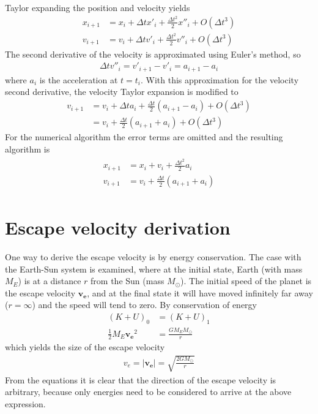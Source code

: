 \documentclass[aps,reprint]{revtex4-1}
\newcommand\blankpage{%
  \null
  \thispagestyle{empty}%
  \addtocounter{page}{-1}%
  \newpage}
\begin{document}
Taylor expanding the position and velocity yields
\begin{align*}
  x_{i+1} &= x_i + \Delta{t} x'_i + \frac{\Delta{t}^2}{2} x''_i + O(\Delta{t}^3) \\
  v_{i+1} &= v_i + \Delta{t} v'_i + \frac{\Delta{t}^2}{2} v''_i + O(\Delta{t}^3)
\end{align*}
The second derivative of the velocity is approximated using Euler's method, so
\begin{align*}
  \Delta{t} v''_i = v'_{i+1} - v'_{i} = a_{i+1} - a_{i}
\end{align*}
where $a_i$ is the acceleration at $t = t_i$. With this approximation for the
velocity second derivative, the velocity Taylor expansion is modified to
\begin{align*}
  v_{i+1} &= v_i + \Delta{t} a_i + \frac{\Delta{t}}{2} (a_{i+1} - a_i) + O(\Delta{t}^3) \\
          &= v_i + \frac{\Delta{t}}{2} (a_{i+1} + a_{i}) + O(\Delta{t}^3)
\end{align*}
For the numerical algorithm the error terms are omitted and the resulting
algorithm is
\begin{align}
  \begin{split}
    x_{i+1} &= x_i + v_i + \frac{\Delta{t}^2}{2} a_i \\
    v_{i+1} &= v_i + \frac{\Delta{t}}{2}(a_{i+1} + a_{i})
  \end{split}
\end{align}
\section{Escape velocity derivation}
\label{sec:escapevelocityderivation}
One way to derive the escape velocity is by energy conservation. The case with the Earth-Sun system
is examined, where at the initial state, Earth (with mass $M_E$) is at a
distance $r$ from the Sun (mass $M_\odot$). The
initial speed of the planet is the escape velocity $\mathbf{v_e}$, and at the
final state it will have moved infinitely far away ($r = \infty$) and the speed
will tend to zero. By conservation of energy
\begin{align*}
  (K + U)_0 &= (K + U)_1 \\
  \frac{1}{2} M_E \mathbf{v_e}^2 &= \frac{GM_E M_\odot}{r}
\end{align*}
which yields the size of the escape velocity
\begin{align}
  v_e = |\mathbf{v_e}| = \sqrt{\frac{2GM_\odot}{r}}
\end{align}
From the equations it is clear that the direction of the escape velocity is
arbitrary, because only energies need to be considered to arrive at the above
expression.
\blankpage
\end{document}
